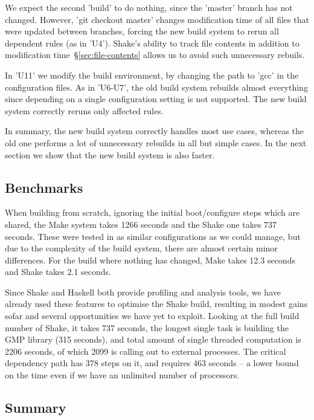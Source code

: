 We expect the second \lst'build' to do nothing, since the \lst'master'
branch has not changed. However, \lst'git checkout master' changes modification
time of all files that were updated between branches, forcing the new
build system to rerun all dependent rules (as in \lst'U4'). Shake's ability to
track file contents in addition to modification time~\S\ref{sec:file-contents}
allows us to avoid such unnecessary rebuils.

In \lst'U11' we modify the build environment, by changing the path to \lst'gcc'
in the configuration files. As in \lst'U6-U7', the old build system rebuilds
almost everything since depending on a single configuration setting is not
supported. The new build system correctly reruns only affected rules.

In summary, the new build system correctly handles most use cases, whereas
the old one performs a lot of unnecessary rebuilds in all but simple cases. In
the next section we show that the new build system is also faster.

\subsection{Benchmarks\label{sec:benchmarks}}

When building from scratch, ignoring the initial boot/configure steps which are shared, the Make system takes 1266 seconds and the Shake one takes 737 seconds. These were tested in as similar configurations as we could manage, but due to the complexity of the build system, there are almost certain minor differences. For the build where nothing has changed, Make takes 12.3 seconds and Shake takes 2.1 seconds. 

Since Shake and Haskell both provide profiling and analysis tools, we have already used these features to optimise the Shake build, resulting in modest gains sofar and several opportunities we have yet to exploit. Looking at the full build number of Shake, it takes 737 seconds, the longest single task is building the GMP library (315 seconds), and total amount of single threaded computation is 2206 seconds, of which 2099 is calling out to external processes. The critical dependency path has 378 steps on it, and requires 463 seconds -- a lower bound on the time even if we have an unlimited number of processors.

\subsection{Summary}





